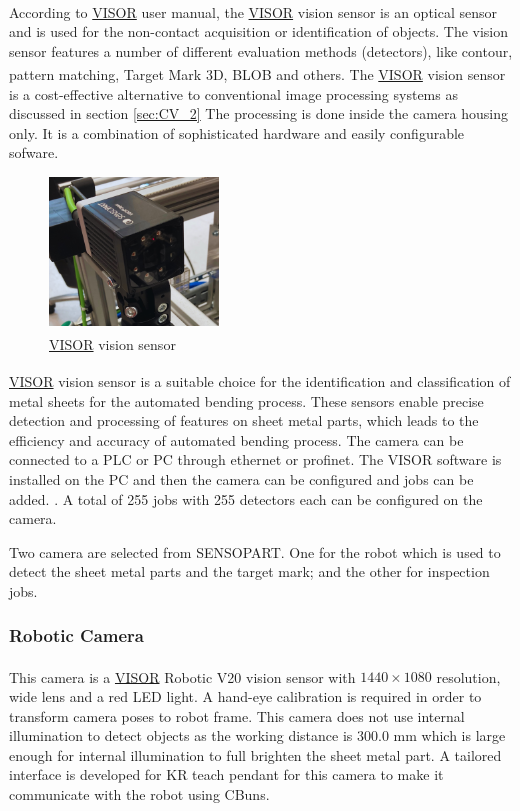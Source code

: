 According to \hyperref[acro:VISOR]{VISOR}\textsuperscript{\textregistered} \cite[page 22]{visor_user_manual} user manual, the \hyperref[acro:VISOR]{VISOR}\textsuperscript{\textregistered} vision sensor is an optical sensor and is used for the non-contact acquisition or identification of objects.
The vision sensor features a number of different evaluation methods (detectors), like contour, pattern matching, Target Mark 3D, BLOB and others.
The \hyperref[acro:VISOR]{VISOR}\textsuperscript{\textregistered} vision sensor is a cost-effective alternative to conventional image processing systems as discussed in
section \ref{sec:CV_2} The processing is done inside the camera housing only. It is a combination of sophisticated hardware and easily configurable sofware. \cite{sensopart-visor}
\begin{figure}[h]
    \centering
    \includegraphics[width=0.4\textwidth]{figures/vision-sensor.png}
    \caption{\hyperref[acro:VISOR]{VISOR}\textsuperscript{\textregistered} vision sensor}
    \label{fig:vision-sensor}
\end{figure}

\hyperref[acro:VISOR]{VISOR}\textsuperscript{\textregistered} vision sensor is a suitable choice for the identification and classification of metal sheets for the automated bending process.
These sensors enable precise detection and processing of features on sheet metal parts, which leads to the efficiency and accuracy of automated bending process.
The camera can be connected to a PLC or PC through ethernet or profinet. The VISOR software is installed on the PC and then the camera can be configured and jobs can be added.
\cite{sensopart-software}. A total of 255 jobs with 255 detectors each can be configured on the camera.

Two camera are selected from SENSOPART. One for the robot which is used to detect the sheet metal parts and the target mark; and the other for inspection jobs.

\subsubsection{Robotic Camera}
\label{subsubsec:robotic-camera}
This camera is a \hyperref[acro:VISOR]{VISOR}\textsuperscript{\textregistered} Robotic V20 vision sensor with $1440 \times 1080$ resolution, wide lens and a red LED light.
\cite{visor-robotic}
A hand-eye calibration is required in order to transform camera poses to robot frame. This camera does not use internal illumination to detect
objects as the working distance is 300.0 mm which is large enough for internal illumination to full brighten the sheet metal part.
A tailored interface is developed for KR teach pendant for this camera to make it communicate with the robot using CBuns.


